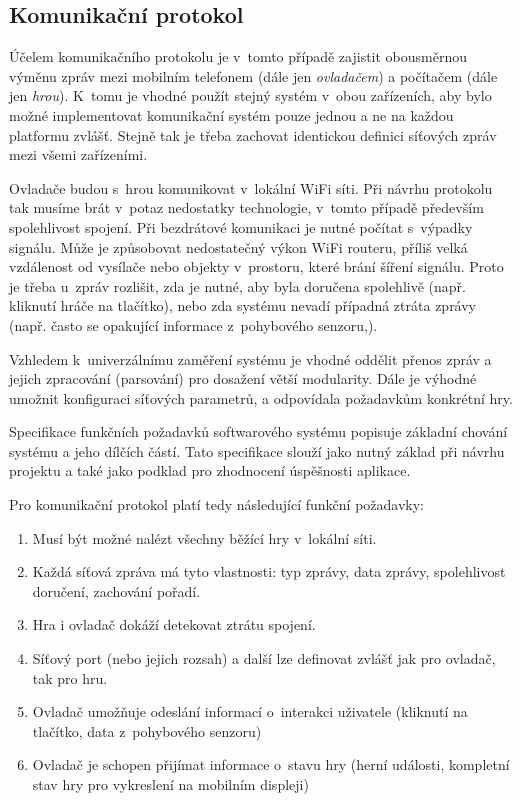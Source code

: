 \documentclass[thesis=B,czech,hidelinks]{FITthesis}[2012/06/26] %
\begin{document}
\subsection{Komunikační protokol}

Účelem komunikačního protokolu je v~tomto případě zajistit obousměrnou výměnu zpráv mezi mobilním telefonem (dále jen \textit{ovladačem}) a počítačem (dále jen \textit{hrou}). K~tomu je vhodné použít stejný systém v~obou zařízeních, aby bylo možné implementovat komunikační systém pouze jednou a ne na každou platformu zvlášť. Stejně tak je třeba zachovat identickou definici síťových zpráv mezi všemi zařízeními.

Ovladače budou s~hrou komunikovat v~lokální WiFi síti. Při návrhu protokolu tak musíme brát v~potaz nedostatky technologie, v~tomto případě především spolehlivost spojení. Při bezdrátové komunikaci je nutné počítat s~výpadky signálu. Může je způsobovat nedostatečný výkon WiFi routeru, příliš velká vzdálenost od vysílače nebo objekty v~prostoru, které brání šíření signálu. Proto je třeba u~zpráv rozlišit, zda je nutné, aby byla doručena spolehlivě (např. kliknutí hráče na tlačítko), nebo zda systému nevadí případná ztráta zprávy (např. často se opakující informace z~pohybového senzoru,). 

Vzhledem k~univerzálnímu zaměření systému je vhodné oddělit přenos zpráv a jejich zpracování (parsování) pro dosažení větší modularity. Dále je výhodné umožnit  konfiguraci síťových parametrů, a odpovídala požadavkům konkrétní hry.

Specifikace funkčních požadavků softwarového systému popisuje základní chování systému a jeho dílčích částí. Tato specifikace slouží jako nutný základ při návrhu projektu a také jako podklad pro zhodnocení úspěšnosti aplikace. \cite{pozadavky}

Pro komunikační protokol platí tedy následující funkční požadavky:

\begin{enumerate}
	\item Musí být možné nalézt všechny běžící hry v~lokální síti.
	\item Každá síťová zpráva má tyto vlastnosti: typ zprávy, data zprávy, spolehlivost doručení, zachování pořadí.
	\item Hra i ovladač dokáží detekovat ztrátu spojení.
	\item Síťový port (nebo jejich rozsah) a další lze definovat zvlášť jak pro ovladač, tak pro hru.
	\item Ovladač umožňuje odeslání informací o~interakci uživatele (kliknutí na tlačítko, data z~pohybového senzoru)
	\item Ovladač je schopen přijímat informace o~stavu hry (herní události, kompletní stav hry pro vykreslení na mobilním displeji)
\end{enumerate}
\end{document}
